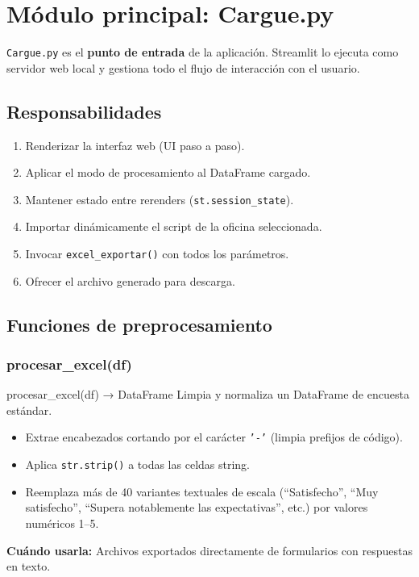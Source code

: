 \documentclass[12pt, letterpaper]{article}
\begin{document}
\section{Módulo principal: Cargue.py}

\texttt{Cargue.py} es el \textbf{punto de entrada} de la aplicación. Streamlit lo ejecuta como servidor web local y gestiona todo el flujo de interacción con el usuario.

\subsection{Responsabilidades}

\begin{enumerate}[leftmargin=1.5cm]
  \item Renderizar la interfaz web (UI paso a paso).
  \item Aplicar el modo de procesamiento al DataFrame cargado.
  \item Mantener estado entre rerenders (\texttt{st.session\_state}).
  \item Importar dinámicamente el script de la oficina seleccionada.
  \item Invocar \texttt{excel\_exportar()} con todos los parámetros.
  \item Ofrecer el archivo generado para descarga.
\end{enumerate}

\subsection{Funciones de preprocesamiento}

\subsubsection{procesar\_excel(df)}

\begin{apibox}{procesar\_excel(df) → DataFrame}
Limpia y normaliza un DataFrame de encuesta estándar.
\begin{itemize}
  \item Extrae encabezados cortando por el carácter \texttt{'-'} (limpia prefijos de código).
  \item Aplica \texttt{str.strip()} a todas las celdas string.
  \item Reemplaza más de 40 variantes textuales de escala (``Satisfecho'', ``Muy satisfecho'', ``Supera notablemente las expectativas'', etc.) por valores numéricos 1--5.
\end{itemize}
\textbf{Cuándo usarla:} Archivos exportados directamente de formularios con respuestas en texto.
\end{apibox}
\end{document}
